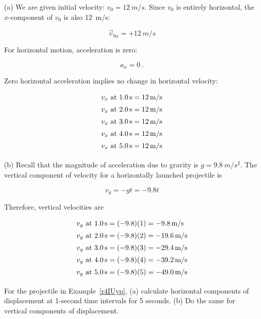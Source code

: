 \documentclass[main.tex]{subfiles}
\begin{document}
\Solution (a) We are given initial velocity: $v_0 = \SI{12}{m/s}$. Since $v_0$ is entirely horizontal, the $x$-component of $v_0$ is also \SI{12}{m/s}:

\begin{equation*}
    \vec{v}_{0x} = +\SI{12}{m/s}
\end{equation*}

For horizontal motion, acceleration is zero:

\begin{equation*}
    a_x = 0\ .
\end{equation*}

Zero horizontal acceleration implies no change in horizontal velocity:
\vspace{-1em}

\begin{align*}
    v_x \text{ at \SI{1.0}{s}} &= \SI{12}{m/s}\\[0.5ex]
    v_x \text{ at \SI{2.0}{s}} &= \SI{12}{m/s}\\[0.5ex]
    v_x \text{ at \SI{3.0}{s}} &= \SI{12}{m/s}\\[0.5ex]
    v_x \text{ at \SI{4.0}{s}} &= \SI{12}{m/s}\\[0.5ex]
    v_x \text{ at \SI{5.0}{s}} &= \SI{12}{m/s}\\[0.5ex]
\end{align*}

(b) Recall that the magnitude of acceleration due to gravity is $g = \SI{9.8}{m/s^2}$. The vertical component of velocity for a horizontally launched projectile is 

\begin{equation*} 
    v_y = -g t = -9.8 t
\end{equation*}

Therefore, vertical velocities are

\begin{align*}
    v_y \text{ at \SI{1.0}{s}} &= (-9.8)(1) = \SI{-9.8}{m/s}\\[0.5ex]
    v_y \text{ at \SI{2.0}{s}} &= (-9.8)(2) = \SI{-19.6}{m/s}\\[0.5ex]
    v_y \text{ at \SI{3.0}{s}} &= (-9.8)(3) = \SI{-29.4}{m/s}\\[0.5ex]
    v_y \text{ at \SI{4.0}{s}} &= (-9.8)(4) = \SI{-39.2}{m/s}\\[0.5ex]
    v_y \text{ at \SI{5.0}{s}} &= (-9.8)(5) = \SI{-49.0}{m/s}\\[0.5ex]
\end{align*}

\begin{example}
    For the projectile in Example~\ref{r4IUyp}, (a) calculate horizontal components of displacement at 1-second time intervals for 5 seconds. (b) Do the same for vertical components of displacement.
\end{example}
\end{document}
